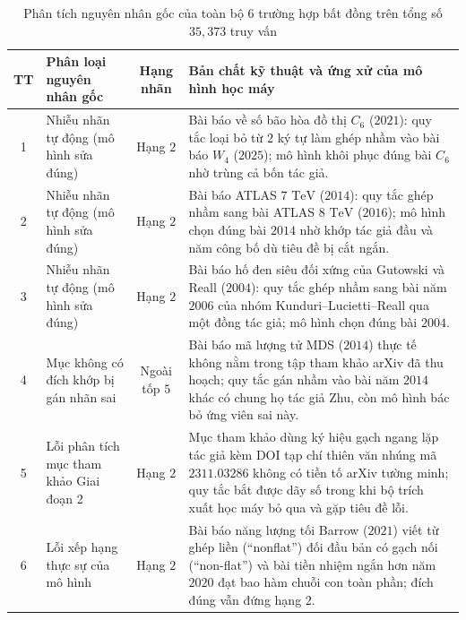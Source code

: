 \begin{table}[htbp]
    \centering
    \scriptsize
    \renewcommand{\arraystretch}{1.18}
    \begin{tabularx}{\textwidth}{c p{} c X}
        \toprule
        \textbf{TT} & \textbf{Phân loại nguyên nhân gốc} & \textbf{Hạng nhãn} & \textbf{Bản chất kỹ thuật và ứng xử của mô hình học máy} \\
        \midrule
        1 & Nhiễu nhãn tự động (mô hình sửa đúng) & Hạng $2$ & Bài báo về số bão hòa đồ thị $C_6$ ($2021$): quy tắc loại bỏ từ $2$ ký tự làm ghép nhầm vào bài báo $W_4$ ($2025$); mô hình khôi phục đúng bài $C_6$ nhờ trùng cả bốn tác giả. \\
        2 & Nhiễu nhãn tự động (mô hình sửa đúng) & Hạng $2$ & Bài báo ATLAS $7\text{ TeV}$ ($2014$): quy tắc ghép nhầm sang bài ATLAS $8\text{ TeV}$ ($2016$); mô hình chọn đúng bài $2014$ nhờ khớp tác giả đầu và năm công bố dù tiêu đề bị cắt ngắn. \\
        3 & Nhiễu nhãn tự động (mô hình sửa đúng) & Hạng $2$ & Bài báo hố đen siêu đối xứng của Gutowski và Reall ($2004$): quy tắc ghép nhầm sang bài năm $2006$ của nhóm Kunduri--Lucietti--Reall qua một đồng tác giả; mô hình chọn đúng bài $2004$. \\
        4 & Mục không có đích khớp bị gán nhãn sai & Ngoài tốp $5$ & Bài báo mã lượng tử MDS ($2014$) thực tế không nằm trong tập tham khảo arXiv đã thu hoạch; quy tắc gán nhầm vào bài năm $2014$ khác có chung họ tác giả Zhu, còn mô hình bác bỏ ứng viên sai này. \\
        5 & Lỗi phân tích mục tham khảo Giai đoạn 2 & Hạng $2$ & Mục tham khảo dùng ký hiệu gạch ngang lặp tác giả kèm DOI tạp chí thiên văn nhúng mã $2311.03286$ không có tiền tố arXiv tường minh; quy tắc bắt được dãy số trong khi bộ trích xuất học máy bỏ qua và gặp tiêu đề lỗi. \\
        6 & Lỗi xếp hạng thực sự của mô hình & Hạng $2$ & Bài báo năng lượng tối Barrow ($2021$) viết từ ghép liền (``nonflat'') đối đầu bản có gạch nối (``non-flat'') và bài tiền nhiệm ngắn hơn năm $2020$ đạt bao hàm chuỗi con toàn phần; đích đúng vẫn đứng hạng $2$. \\
        \bottomrule
    \end{tabularx}
    \caption{Phân tích nguyên nhân gốc của toàn bộ $6$ trường hợp bất đồng trên tổng số $35{,}373$ truy vấn}
    \label{tab:m3_error_forensics}
\end{table}

